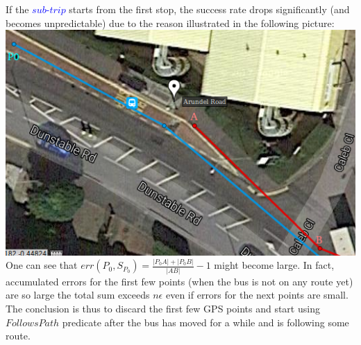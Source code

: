 If the \textcolor{blue}{$sub$-$trip$} starts from the first stop,
the success rate drops significantly (and becomes unpredictable) due to
the reason illustrated in the following picture: \\

\includegraphics[scale = 0.7]{figs/stop0.png} \\

One can see that $err(P_0, S_{P_0}) = \frac{|{P_0}A| + |{P_0}B|}{|AB|} - 1$
might become large. In fact, accumulated errors for the first
few points (when the bus is not on any route yet) are so large the total
sum exceeds $n\epsilon$ even if errors for the next points are small. \\

The conclusion is thus to discard the first few GPS points and start using
$FollowsPath$ predicate after the bus has moved for a while and is following
some route.
